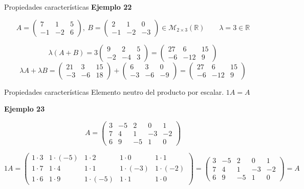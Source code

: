 \documentclass[
  ignorenonframetext,
]{beamer}
\begin{document}
\begin{frame}{Propiedades características}
\protect\hypertarget{propiedades-caracteruxedsticas-17}{}
\textbf{Ejemplo 22}

\[A = \begin{pmatrix}7&1&5\\-1&-2&6\end{pmatrix},\  B=\begin{pmatrix}2&1&0\\-1&-2&-3\end{pmatrix}\in\mathcal{M}_{2\times 3}(\mathbb{R})\qquad \lambda = 3\in\mathbb{R}\]

\[\lambda(A+B)=3\begin{pmatrix}9&2&5\\-2&-4&3\end{pmatrix}=\begin{pmatrix}27&6&15\\-6&-12&9\end{pmatrix}\]
\[\lambda A+\lambda B=\begin{pmatrix}21&3&15\\-3&-6&18\end{pmatrix}+\begin{pmatrix}6&3&0\\-3&-6&-9\end{pmatrix} =\begin{pmatrix}27&6&15\\-6&-12&9\end{pmatrix} \]
\end{frame}

\begin{frame}{Propiedades características}
\protect\hypertarget{propiedades-caracteruxedsticas-18}{}
Elemento neutro del producto por escalar. \(1A=A\)

\textbf{Ejemplo 23}

\[A = \begin{pmatrix}3&-5&2&0&1\\7&4&1&-3&-2\\6&9&-5&1&0\end{pmatrix}\]

\[1A = \begin{pmatrix}1\cdot3&1\cdot(-5)&1\cdot2&1\cdot0&1\cdot1\\1\cdot7&1\cdot4&1\cdot1&1\cdot(-3)&1\cdot(-2)\\1\cdot6&1\cdot9&1\cdot(-5)&1\cdot1&1\cdot0\end{pmatrix}=\begin{pmatrix}3&-5&2&0&1\\7&4&1&-3&-2\\6&9&-5&1&0\end{pmatrix}=A\]
\end{frame}
\end{document}
